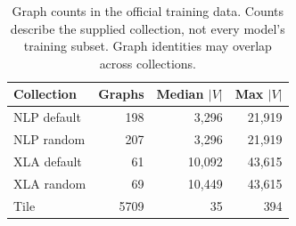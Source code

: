 \begin{table}[t]
\centering
\begin{tabular}{@{}lrrr@{}}
\toprule
Collection & Graphs & Median $|V|$ & Max $|V|$ \\
\midrule
NLP default & 198 & 3,296 & 21,919 \\
NLP random & 207 & 3,296 & 21,919 \\
XLA default & 61 & 10,092 & 43,615 \\
XLA random & 69 & 10,449 & 43,615 \\
Tile & 5709 & 35 & 394 \\
\bottomrule
\end{tabular}
\caption{Graph counts in the official training data. Counts describe the supplied collection, not every model's training subset. Graph identities may overlap across collections.}
\label{tab:data}
\end{table}
